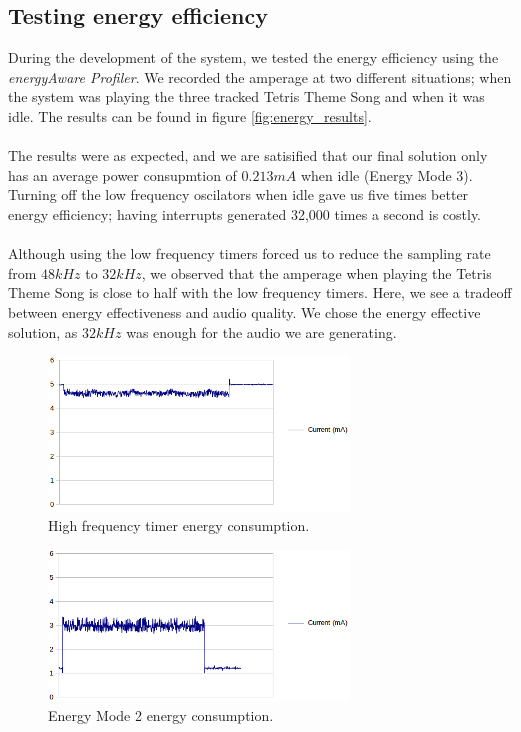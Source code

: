 \subsection{Testing energy efficiency}
During the development of the system, we tested the energy efficiency using the \emph{energyAware Profiler}. We recorded the amperage at two different situations; when the system was playing the three tracked Tetris Theme Song and when it was idle. The results can be found in figure \ref{fig:energy_results}. \\
\\
The results were as expected, and we are satisified that our final solution only has an average power consupmtion of $0.213mA$ when idle (Energy Mode 3). Turning off the low frequency oscilators when idle gave us five times better energy efficiency; having interrupts generated 32,000 times a second is costly.\\
\\
Although using the low frequency timers forced us to reduce the sampling rate from $48kHz$ to $32kHz$, we observed that the amperage when playing the Tetris Theme Song is close to half with the low frequency timers. Here, we see a tradeoff between energy effectiveness and audio quality. We chose the energy effective solution, as $32kHz$ was enough for the audio we are generating.

\begin{figure}[hf]
	\centering
	\includegraphics[width=8cm]{img/hf.png}
	\caption{High frequency timer energy consumption.}
	\label{fig:hf}
\end{figure}
	
\begin{figure}[hf]
	\centering
	\includegraphics[width=8cm]{img/em3.png}
	\caption{Energy Mode 2 energy consumption.}
	\label{fig:em3}
\end{figure}


